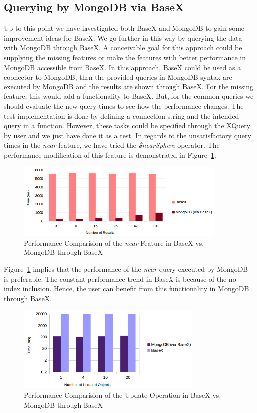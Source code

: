 \documentclass[a4paper,12pt]{article}
\begin{document}
\subsection{Querying by MongoDB via BaseX}
Up to this point we have investigated both BaseX and MongoDB to gain some improvement ideas for BaseX. We go further in this way by querying the data with MongoDB through BaseX. A conceivable goal for this approach could be supplying the missing features or make the features with better performance in MongoDB accessible from BaseX. In this approach, BaseX could be used as a coonector to MongoDB, then the provided queries in MongoDB syntax are executed by MongoDB and the results are shown through BaseX. For the missing feature, this would add a functionality to BaseX. But, for the common queries we should evaluate the new query times to see how the performance changes. 
The test implementation is done by defining a connection string and the intended query in a function. However, these tasks could be specified through the XQuery by user and we just have done it as a test. 
In regards to the unsatisfactory query times in the \textit{near} feature, we have tried the \textit{\$nearSphere} operator. The performance modification of this feature is demonstrated in Figure~\ref{figMongoviaBX-near}.
 
\begin{figure}
\centering
\includegraphics[width=0.9\textwidth]{MongoviaBX-near.png}
\caption{Performance Comparision of the \textit{near} Feature in BaseX vs. MongoDB through BaseX}
\label{figMongoviaBX-near}
\end{figure}

Figure~\ref{figMongoviaBX-near} implies that the performance of the \textit{near} query executed by MongoDB is preferable. The constant performance trend in BaseX is because of the no index inclusion. Hence, the user can benefit from this functionality in MongoDB through BaseX. 


\begin{figure}
\centering
\includegraphics[width=0.8\textwidth]{MongoviaBX-Update.png}
\caption{Performance Comparision of the Update Operation in BaseX vs. MongoDB through BaseX}
\label{figMongoviaBX-update}
\end{figure}
\end{document}
